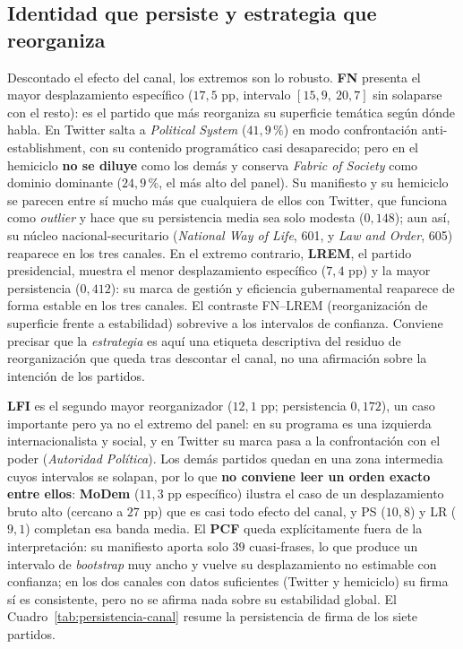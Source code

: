 \subsection{Identidad que persiste y estrategia que reorganiza}
\label{sec:res-declarada-persistencia}

Descontado el efecto del canal, los extremos son lo robusto. \textbf{FN} presenta
el mayor desplazamiento específico ($17{,}5$ pp, intervalo $[15{,}9,\ 20{,}7]$ sin
solaparse con el resto): es el partido que más reorganiza su superficie temática
según dónde habla. En Twitter salta a \emph{Political System} ($41{,}9\,\%$) en
modo confrontación anti-establishment, con su contenido programático casi
desaparecido; pero en el hemiciclo \textbf{no se diluye} como los demás y conserva
\emph{Fabric of Society} como dominio dominante ($24{,}9\,\%$, el más alto del
panel). Su manifiesto y su hemiciclo se parecen entre sí mucho más que cualquiera
de ellos con Twitter, que funciona como \emph{outlier} y hace que su persistencia
media sea solo modesta ($0{,}148$); aun así, su núcleo nacional-securitario
(\emph{National Way of Life}, 601, y \emph{Law and Order}, 605) reaparece en
los tres canales. En el extremo contrario, \textbf{LREM}, el partido presidencial,
muestra el menor desplazamiento específico ($7{,}4$ pp) y la mayor persistencia
($0{,}412$): su marca de gestión y eficiencia gubernamental reaparece de forma
estable en los tres canales. El contraste FN--LREM (reorganización de superficie
frente a estabilidad) sobrevive a los intervalos de confianza. Conviene precisar
que la \emph{estrategia} es aquí una etiqueta descriptiva del residuo de
reorganización que queda tras descontar el canal, no una afirmación sobre la
intención de los partidos.

\textbf{LFI} es el segundo mayor reorganizador ($12{,}1$ pp; persistencia
$0{,}172$), un caso importante pero ya no el extremo del panel: en su programa es
una izquierda internacionalista y social, y en Twitter su marca pasa a la
confrontación con el poder (\emph{Autoridad Política}). Los demás partidos quedan
en una zona intermedia cuyos intervalos se solapan, por lo que \textbf{no conviene
leer un orden exacto entre ellos}: \textbf{MoDem} ($11{,}3$ pp específico) ilustra
el caso de un desplazamiento bruto alto (cercano a $27$ pp) que es casi todo
efecto del canal, y PS ($10{,}8$) y LR ($9{,}1$) completan esa banda media. El
\textbf{PCF} queda explícitamente fuera de la interpretación: su manifiesto aporta
solo $39$ cuasi-frases, lo que produce un intervalo de \emph{bootstrap} muy ancho
y vuelve su desplazamiento no estimable con confianza; en los dos canales con
datos suficientes (Twitter y hemiciclo) su firma sí es consistente, pero no se
afirma nada sobre su estabilidad global. El Cuadro~\ref{tab:persistencia-canal}
resume la persistencia de firma de los siete partidos.


